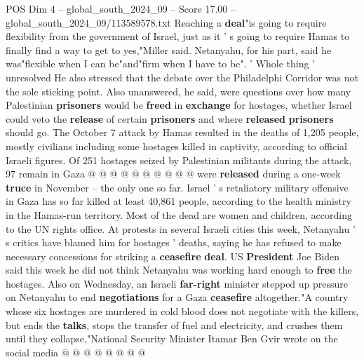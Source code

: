 \begin{textsample}{POS Dim 4 – global\_south\_2024\_09 – Score 17.00 – global\_south\_2024\_09/113589578.txt}
Reaching a \textbf{deal}"is going to require flexibility from the government of Israel, just as it ' s going to require Hamas to finally find a way to get to yes,"Miller said.
Netanyahu, for his part, said he was"flexible when I can be"and"firm when I have to be". ' Whole thing ' unresolved He also stressed that the debate over the Philadelphi Corridor was not the sole sticking point.
Also unanswered, he said, were questions over how many Palestinian \textbf{prisoners} would be \textbf{freed} in \textbf{exchange} for hostages, whether Israel could veto the \textbf{release} of certain \textbf{prisoners} and where \textbf{released} \textbf{prisoners} should go.
The October 7 attack by Hamas resulted in the deaths of 1,205 people, mostly civilians including some hostages killed in captivity, according to official Israeli figures.
Of 251 hostages seized by Palestinian militants during the attack, 97 remain in Gaza @ @ @ @ @ @ @ @ @ @ were \textbf{released} during a one-week \textbf{truce} in November -- the only one so far.
Israel ' s retaliatory military offensive in Gaza has so far killed at least 40,861 people, according to the health ministry in the Hamas-run territory.
Most of the dead are women and children, according to the UN rights office.
At protests in several Israeli cities this week, Netanyahu ' s critics have blamed him for hostages ' deaths, saying he has refused to make necessary concessions for striking a \textbf{ceasefire} \textbf{deal}.
US \textbf{President} Joe Biden said this week he did not think Netanyahu was working hard enough to \textbf{free} the hostages.
Also on Wednesday, an Israeli \textbf{far-right} minister stepped up pressure on Netanyahu to end \textbf{negotiations} for a Gaza \textbf{ceasefire} altogether."A country whose six hostages are murdered in cold blood does not negotiate with the killers, but ends the \textbf{talks}, stops the transfer of fuel and electricity, and crushes them until they collapse,"National Security Minister Itamar Ben Gvir wrote on the social media @ @ @ @ @ @ @ @

\end{textsample}
